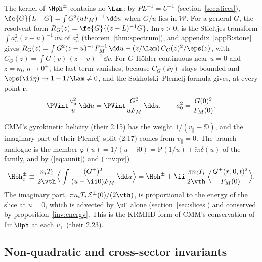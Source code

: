 The kernel of $\Hph^\pm$ contains no $\Lam$: by $PL^{-1}=U^{-1}$ (section~\ref{sec:slices}), $\fe{G}{L^{-1}G}=\int G^2(uF_M)^{-1}\,\dd u$ when $G/u$ lies in $\mathcal W$. For a general $G$, the resolvent form $R_G(z)=\fe{G}{(z-L)^{-1}G}$, $\mathrm{Im}\,z>0$, is the Stieltjes transform $\int a_u^2(z-u)^{-1}\,\dd u$ of $a_u^2$ (theorem~\ref{thm:spectrum}), and appendix~\ref{appB:stone} gives $R_G(z)=\int G^2(z-u)^{-1}F_M^{-1}\,\dd u-(z/\Lam)\,C_G(z)^2/\eps(z)$, with $C_G(z)=\int G(v)\,(z-v)^{-1}\,\dd v$. For $G$ H\"older continuous near $u=0$ and $z=\ii\eta$, $\eta\to0^+$, the last term vanishes, because $C_G(\ii\eta)$ stays bounded and $\eps(\ii\eta)\to1-1/\Lam\neq0$, and the Sokhotski--Plemelj formula gives, at every point $\boldsymbol r$,
\begin{equation}\label{inv:pv}
  \PVint\frac{a_u^2}{u}\,\dd u=\PVint\frac{G^2}{uF_M}\,\dd u,\qquad a_0^2=\frac{G(0)^2}{F_M(0)} .
\end{equation}

CMM's gyrokinetic helicity (their 2.15) has the weight $1/(v_\parallel-\ii0)$, and the imaginary part of their Plemelj split (2.17) comes from $v_\parallel=0$. The branch analogue is the member $\varphi(u)=1/(u-\ii0)=\mathrm P(1/u)+\ii\pi\delta(u)$ of the family, and by (\ref{eq:aunit}) and (\ref{inv:pv})
\begin{equation}\label{eq:Hcomplex}
  \Hph^\pm_{\mathrm c}\equiv\frac{n_iT_i}{2\vth}\Big\langle\int\frac{(G^\pm)^2}{(u-\ii0)F_M}\,\dd u\Big\rangle
  =\Hph^\pm+\ii\,\frac{\pi n_iT_i}{2\vth}\,\Big\langle\frac{G^\pm(\boldsymbol r,0,t)^2}{F_M(0)}\Big\rangle .
\end{equation}
The imaginary part, $\pi n_iT_i\,\mathcal E^\pm(0)/(2\vth)$, is proportional to the energy of the slice at $u=0$, which is advected by $\uE$ alone (section~\ref{sec:slices}) and conserved by proposition~\ref{inv:energy}. This is the KRMHD form of CMM's conservation of $\mathrm{Im}\,\Hph$ at each $v_\perp$ (their 2.23).

\subsection{Non-quadratic and cross-sector invariants}\label{inv:casimirs}

